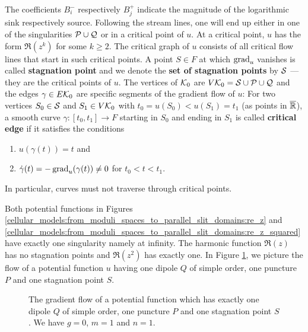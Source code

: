 The coefficients $B_i^-$ respectively $B_j^+$ indicate the magnitude of the logarithmic sink respectively source.
Following the stream lines, one will end up either in one of the singularities $\mathcal{P} \cup \mathcal{Q}$ or in a critical point of $u$.
At a critical point, $u$ has the form $\Re(z^k)$ for some $k \ge 2$.
The critical graph of $u$ consists of all critical flow lines that start in such critical points. %
\label{page:stagnation_point_parallel}%
A point $S \in F$ at which $\operatorname{grad}_u$ vanishes is called {\bfseries stagnation point} and we denote the {\bfseries set of stagnation points} by $\mathcal{S}$ --- they are the critical points of $u$.
\label{page:critical_graph_parallel}%
The vertices of $\mathcal{K}_0$ are $V\mathcal{K}_0 = \mathcal{S} \cup \mathcal{P} \cup \mathcal{Q}$ and the edges $\gamma \in E\mathcal{K}_0$ are specific segments of the gradient flow of $u$:
For two vertices $S_0 \in \mathcal{S}$ and $S_1 \in V\mathcal{K}_0$ with $t_0 = u(S_0) < u(S_1) = t_1$ (as points in $\overline {\mathbb R}$),
a smooth curve $\gamma \colon [t_0, t_1] \to F$ starting in $S_0$ and ending in $S_1$ is called {\bfseries critical edge} if it satisfies the conditions
\begin{enumerate}
    \item $u(\gamma(t)) = t$ and
    \item $\dot{\gamma}(t) = -\operatorname{grad}_u(\gamma(t)) \neq 0$ for $t_0 < t < t_1$.
\end{enumerate}
In particular, curves must not traverse through critical points.

Both potential functions in Figures \ref{cellular_models:from_moduli_spaces_to_parallel_slit_domains:re_z} and
\ref{cellular_models:from_moduli_spaces_to_parallel_slit_domains:re_z_squared} have exactly one singularity namely at infinity. 
The harmonic function $\Re(z)$ has no stagnation points and $\Re(z^2)$ has exactly one.
In Figure \ref{cellular_models:from_moduli_spaces_to_parallel_slit_domains:flow_with_one_puncture}, we picture the flow of a potential function $u$
having one dipole $Q$ of simple order, one puncture $P$ and one stagnation point $S$.
\begin{figure}[ht]
    \centering
    \def\svgwidth{.9\columnwidth}
    
    \caption{\label{cellular_models:from_moduli_spaces_to_parallel_slit_domains:flow_with_one_puncture}The gradient flow of a potential function which has exactly one dipole $Q$ of simple order, one puncture $P$ and one stagnation point $S$.
        We have $g=0$, $m=1$ and $n=1$.}
\end{figure}

